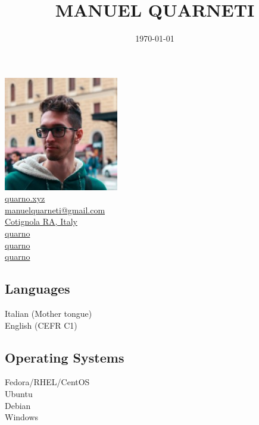 \documentclass{article}
\title{\HUGE \bfseries MANUEL QUARNETI \\[-20pt]}
\author{}
\date{\today}
\begin{document}
\setmainfont{Inter}

\setlength{\columnsep}{2.2em}
\setlength{\columnseprule}{4pt}
\begin{paracol}{2}

\begin{center}
    \includegraphics[height=5cm]{me} \\[20pt]

    \href{https://quarno.xyz/}{ quarno.xyz} \\[8pt]
    \href{mailto:manuelquarneti@gmail.com}{ manuelquarneti@gmail.com} \\[8pt]
    \href{https://www.openstreetmap.org/relation/43112}{ Cotignola RA, Italy} \\[8pt]
    \href{https://github.com/quarno}{ quarno} \\[8pt]
    \href{https://www.linkedin.com/in/quarno}{ quarno} \\[8pt]
    \href{https://t.me/quarno}{ quarno}

    \vfill

    \subsection*{\center Languages}
     Italian (Mother tongue) \\[4pt]
     English (CEFR C1)

    \subsection*{\center Operating Systems}
     Fedora/RHEL/CentOS \\[4pt]
     Ubuntu \\[4pt]
     Debian \\[4pt]
     Windows


\end{center}
\end{paracol}
\end{document}
